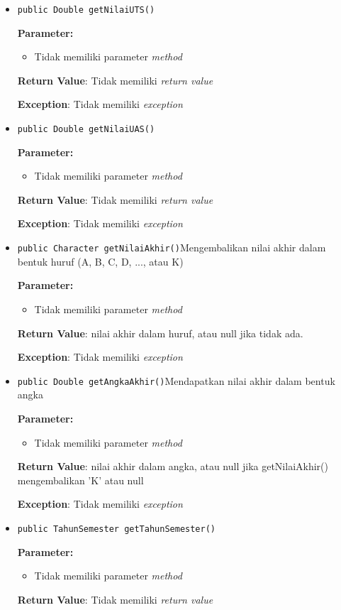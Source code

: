 \documentclass{article}
\begin{document}
\begin{enumerate}
\begin{itemize}
\item \texttt{public Double getNilaiUTS()}

\textbf{Parameter:}
\begin{itemize}
\item Tidak memiliki parameter \textit{method}
\end{itemize}
\textbf{Return Value}: Tidak memiliki \textit{return value}

\textbf{Exception}: Tidak memiliki \textit{exception}

\item \texttt{public Double getNilaiUAS()}

\textbf{Parameter:}
\begin{itemize}
\item Tidak memiliki parameter \textit{method}
\end{itemize}
\textbf{Return Value}: Tidak memiliki \textit{return value}

\textbf{Exception}: Tidak memiliki \textit{exception}

\item \texttt{public Character getNilaiAkhir()}Mengembalikan nilai akhir dalam bentuk huruf (A, B, C, D, ..., atau K)

\textbf{Parameter:}
\begin{itemize}
\item Tidak memiliki parameter \textit{method}
\end{itemize}
\textbf{Return Value}: nilai akhir dalam huruf, atau null jika tidak ada.

\textbf{Exception}: Tidak memiliki \textit{exception}

\item \texttt{public Double getAngkaAkhir()}Mendapatkan nilai akhir dalam bentuk angka

\textbf{Parameter:}
\begin{itemize}
\item Tidak memiliki parameter \textit{method}
\end{itemize}
\textbf{Return Value}: nilai akhir dalam angka, atau null jika getNilaiAkhir() mengembalikan 'K' atau null

\textbf{Exception}: Tidak memiliki \textit{exception}

\item \texttt{public TahunSemester getTahunSemester()}

\textbf{Parameter:}
\begin{itemize}
\item Tidak memiliki parameter \textit{method}
\end{itemize}
\textbf{Return Value}: Tidak memiliki \textit{return value}


\end{itemize}
\end{enumerate}
\end{document}
